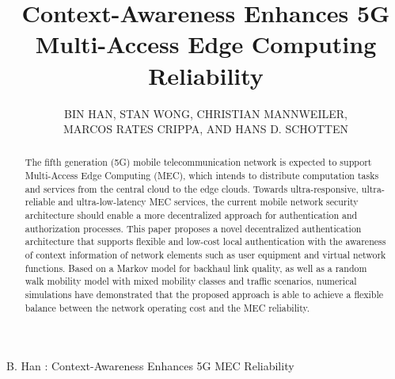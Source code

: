 \documentclass{ieeeaccess}
\newcommand{\change}[1]{#1}
\begin{document}
	\doi{}
	
	\title{Context-Awareness Enhances 5G Multi-Access Edge Computing Reliability}
	\author{\uppercase{Bin Han}, \uppercase{Stan Wong}, \uppercase{Christian Mannweiler},\\
	\uppercase{Marcos Rates Crippa},	\uppercase{and Hans D. Schotten}}
	\address[1]{Institute of Wireless Communication, Technische Universit\"at Kaiserslautern, 67655 Kaiserslautern, Germany}
	\address[2]{UbiXpace, E3 4PU London, UK.}
	\address[3]{Nokia Bell Labs Germany, 81541 Munich, Germany}
	\address[4]{Research Group Intelligent Networks, German Research Center for Artificial Intelligence (DFKI GmbH), 67663 Kaiserslautern, Germany.}
	
	\markboth
	{B. Han \headeretal: Context-Awareness Enhances 5G MEC Reliability}	{}
	
	
	\begin{abstract}
	The fifth generation (5G) mobile telecommunication network is expected to support \change{Multi-Access Edge Computing} (MEC), which intends to distribute computation tasks and services from the central cloud to the edge clouds. Towards ultra-responsive, ultra-reliable and ultra-low-latency MEC services, the current mobile network security architecture should enable a more decentralized approach for authentication and authorization processes. This paper proposes a novel \change{decentralized} authentication architecture that supports flexible and low-cost local authentication with the awareness \change{of} context information of network elements such as user equipment and virtual network functions. \change{Based on a Markov model for backhaul link quality, as well as a random walk mobility model with mixed mobility classes and traffic scenarios, numerical simulations have demonstrated that the proposed approach is able to achieve a flexible balance between the network operating cost and the MEC reliability.}
	\end{abstract}
	
\end{document}

